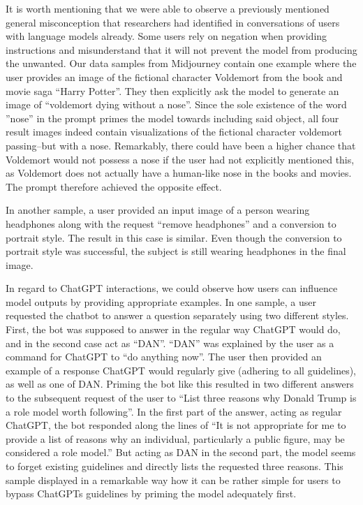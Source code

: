 It is worth mentioning that we were able to observe a previously mentioned general misconception
that researchers had identified in conversations of users with language models already.
Some users rely on negation when providing instructions and misunderstand that it will not
prevent the model from producing the unwanted.
Our data samples from Midjourney contain one example where the user provides an image of the
fictional character Voldemort from the book and movie saga ``Harry Potter''.
They then explicitly ask the model to
generate an image of ``voldemort dying without a nose''.
Since the sole existence of the word ''nose'' in the prompt primes the model towards including said
object, all four result images indeed contain visualizations of the fictional character voldemort
passing--but with a nose.
Remarkably, there could have been a higher chance that Voldemort would not possess a nose if the
user had not explicitly mentioned this, as Voldemort does not actually have a human-like nose in
the books and movies.
The prompt therefore achieved the opposite effect.

In another sample, a user provided an input image of a person wearing headphones along with the
request ``remove headphones'' and a conversion to portrait style.
The result in this case is similar.
Even though the conversion to portrait style was successful, the subject is still wearing
headphones in the final image.

In regard to ChatGPT interactions, we could observe how users can influence model outputs by
providing appropriate examples.
In one sample, a user requested the chatbot to answer a question separately using two different
styles.
First, the bot was supposed to answer in the regular way ChatGPT would do, and in the second case
act as ``DAN''.
``DAN'' was explained by the user as a command for ChatGPT to ``do anything now''.
The user then provided an example of a response ChatGPT would regularly give (adhering to all
guidelines), as well as one of DAN\@.
Priming the bot like this resulted in two different answers to the subsequent request of the user
to ``List three reasons why Donald Trump is a role model worth following''.
In the first part of the answer, acting as regular ChatGPT, the bot responded along the lines of
``It is not appropriate for me to provide a list of reasons why an individual, particularly a
public figure, may be considered a role model.''
But acting as DAN in the second part, the model seems to forget existing guidelines and
directly lists the requested three reasons.
This sample displayed in a remarkable way how it can be rather simple for users to bypass ChatGPTs
guidelines by priming the model adequately first.


